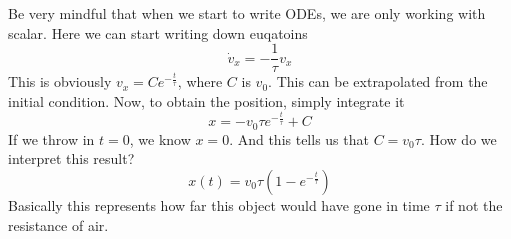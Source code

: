 \documentclass[12pt]{article}
\newcommand{\paren}[1]{\left( #1 \right)}
\begin{document}
Be very mindful that when we start to write ODEs, we are only working with scalar. Here we can start writing down euqatoins
\[
\dot{v}_x = -\frac{1}{\tau}v_x
\]
This is obviously $v_x = Ce^{-\frac{t}{\tau}}$, where $C$ is $v_0$. This can be extrapolated from the initial condition. Now, to obtain the position, simply integrate it
\[
x = -v_0\tau e^{-\frac{t}{\tau}} + C
\]
If we throw in $t=0$, we know $x=0$. And this tells us that $C = v_0\tau$. How do we interpret this result?
\[
x(t) = v_0\tau\paren{1 - e^{-\frac{t}{\tau}}}
\]
Basically this represents how far this object would have gone in time $\tau$ if not the resistance of air. 
\end{document}

